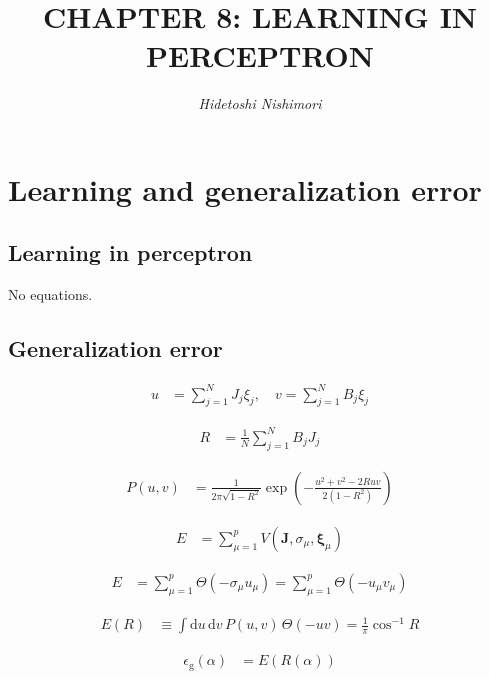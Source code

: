 \documentclass{article}
\title{\LARGE\scshape\MakeUppercase{Chapter 8: Learning in perceptron}}
\author{\textit{Hidetoshi Nishimori}}
\date{}  %
\begin{document}
\maketitle

\section{Learning and generalization error}

\subsection{Learning in perceptron}

No equations.

\subsection{Generalization error}

\begin{align*}
u &= \sum_{j=1}^{N} J_{j} \xi_{j}, \quad v = \sum_{j=1}^{N} B_{j} \xi_{j}
\tag{8.1}
\end{align*}

\begin{align*}
R &= \frac{1}{N} \sum_{j=1}^{N} B_{j} J_{j} \tag{8.2}
\end{align*}

\begin{align*}
P(u, v) &= \frac{1}{2 \pi \sqrt{1 - R^2}} \exp \left(-\frac{u^2 + v^2 - 2 R u v}{2 (1 - R^2)}\right) \tag{8.3}
\end{align*}

\begin{align*}
E &= \sum_{\mu=1}^{p} V(\boldsymbol{J}, \sigma_{\mu}, \boldsymbol{\xi}_{\mu}) \tag{8.4}
\end{align*}

\begin{align*}
E &= \sum_{\mu=1}^{p} \Theta\left(-\sigma_{\mu} u_{\mu}\right) = \sum_{\mu=1}^{p} \Theta\left(-u_{\mu} v_{\mu}\right) \tag{8.5}
\end{align*}

\begin{align*}
E(R) &\equiv \int \mathrm{d}u \, \mathrm{d}v \, P(u, v) \, \Theta(-uv) = \frac{1}{\pi} \cos^{-1} R \tag{8.6}
\end{align*}

\begin{align*}
\epsilon_{\mathrm{g}}(\alpha) &= E(R(\alpha)) \tag{8.7}
\end{align*}
\end{document}
